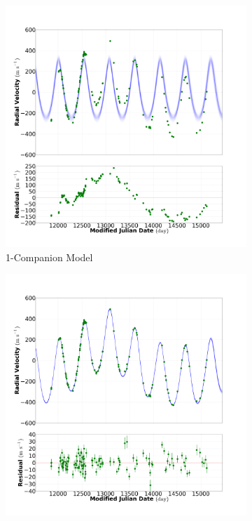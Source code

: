 \documentclass[letterpaper, preprint]{aastex}
\begin{document}
\begin{figure}
	\begin{subfigure}[b]{0.49\textwidth}
		 \includegraphics[width=\textwidth]{fit_res_282_mod_1_20130930.png}
		\caption{1-Companion Model}
	\end{subfigure}
	\begin{subfigure}[b]{0.49\textwidth}
		 \includegraphics[width=\textwidth]{fit_res_282_mod_2_20130930.png}

\end{subfigure}
\end{figure}
\end{document}
